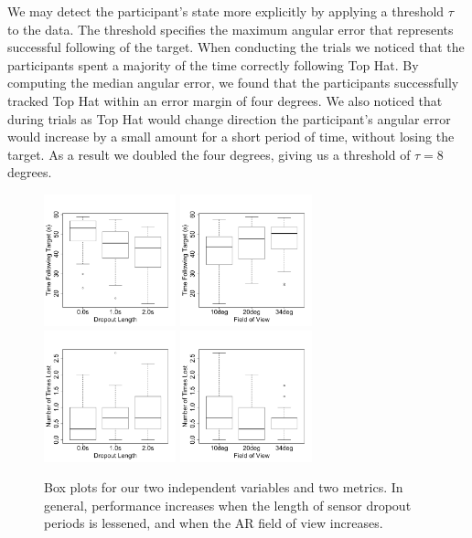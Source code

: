 \documentclass{acmsiggraph}                     %
\begin{document}
We may detect the participant's state more explicitly by applying a threshold $\tau$ to the data.  The threshold specifies the maximum angular error that represents successful following of the target. 
When conducting the trials we noticed that the participants spent a majority of the time correctly following Top Hat.  By computing the median angular error, we found that the participants successfully tracked Top Hat within an error margin of four degrees.  We also noticed that during trials as Top Hat would change direction the participant's angular error would increase by a small amount for a short period of time, without losing the target.  As a result we doubled the four degrees, giving us a threshold of $\tau = 8$ degrees.  
\begin{figure}[t]
	\centering
	\includegraphics[width=1.5in]{figures/tt_deadlen.pdf}
	\includegraphics[width=1.5in]{figures/tt_fov.pdf}\\
	\includegraphics[width=1.5in]{figures/numtimes_deadlen.pdf}
	\includegraphics[width=1.5in]{figures/numtimes_fov.pdf}
	\caption{\label{fig:boxplots}Box plots for our two independent variables and two metrics.  In general, performance increases when the length of sensor dropout periods is lessened, and when the AR field of view increases.}
\end{figure}
\end{document}

